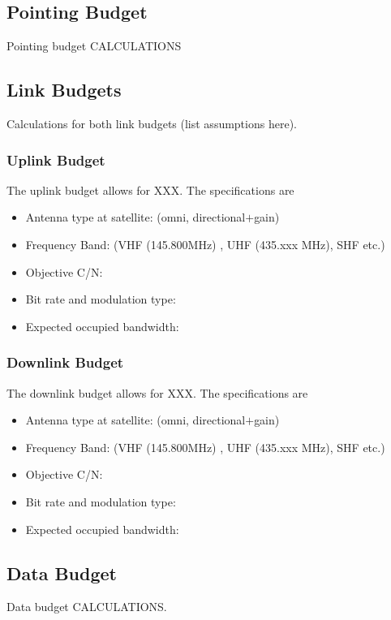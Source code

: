 \subsection{Pointing Budget}
Pointing budget CALCULATIONS

\subsection{Link Budgets}
Calculations for both link budgets (list assumptions here).

\subsubsection{Uplink Budget}
The uplink budget allows for XXX. The specifications are
\begin{itemize}
    \item Antenna type at satellite: (omni, directional$+$gain)
    \item Frequency Band: (VHF (145.800MHz) , UHF (435.xxx MHz), SHF etc.)
    \item Objective C/N:
    \item Bit rate and modulation type:
    \item Expected occupied bandwidth:
\end{itemize}

\subsubsection{Downlink Budget}
The downlink budget allows for XXX. The specifications are
\begin{itemize}
    \item Antenna type at satellite: (omni, directional$+$gain)
    \item Frequency Band: (VHF (145.800MHz) , UHF (435.xxx MHz), SHF etc.)
    \item Objective C/N:
    \item Bit rate and modulation type:
    \item Expected occupied bandwidth:
\end{itemize}

\subsection{Data Budget}
Data budget CALCULATIONS.



